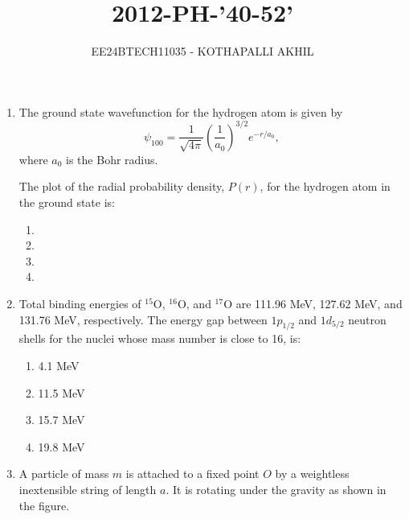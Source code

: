 \documentclass[article]{IEEEtran}
\numberwithin{figure}{enumi}
\begin{document}


\title{2012-PH-'40-52'}
\author{EE24BTECH11035 - KOTHAPALLI AKHIL}
{\let\newpage\relax\maketitle}


\begin{enumerate}
    \item The ground state wavefunction for the hydrogen atom is given by 
  \begin{equation*}
     \psi_{100} = \frac{1}{\sqrt{4 \pi}} \left(\frac{1}{a_0}\right)^{3/2} e^{-r/a_0},  
  \end{equation*}  
    where $a_0$ is the Bohr radius.

    The plot of the radial probability density, $P(r)$, for the hydrogen atom in the ground state is:
    
    \begin{enumerate}
        \item 
       
        \item 
        
        
        \item 
        
        
        \item 
    
    \end{enumerate}
    
\item Total binding energies of $^{15}\text{O}$, $^{16}\text{O}$, and $^{17}\text{O}$ are 111.96 MeV, 127.62 MeV, and 131.76 MeV, respectively. The energy gap between $1p_{1/2}$ and $1d_{5/2}$ neutron shells for the nuclei whose mass number is close to 16, is:
    
    \begin{enumerate}
        \item 4.1 MeV
        \item 11.5 MeV
        \item 15.7 MeV
        \item 19.8 MeV
    \end{enumerate}
  
    \item A particle of mass $m$ is attached to a fixed point $O$ by a weightless inextensible string of length $a$. It is rotating under the gravity as shown in the figure.
    

\end{enumerate}
\end{document}

